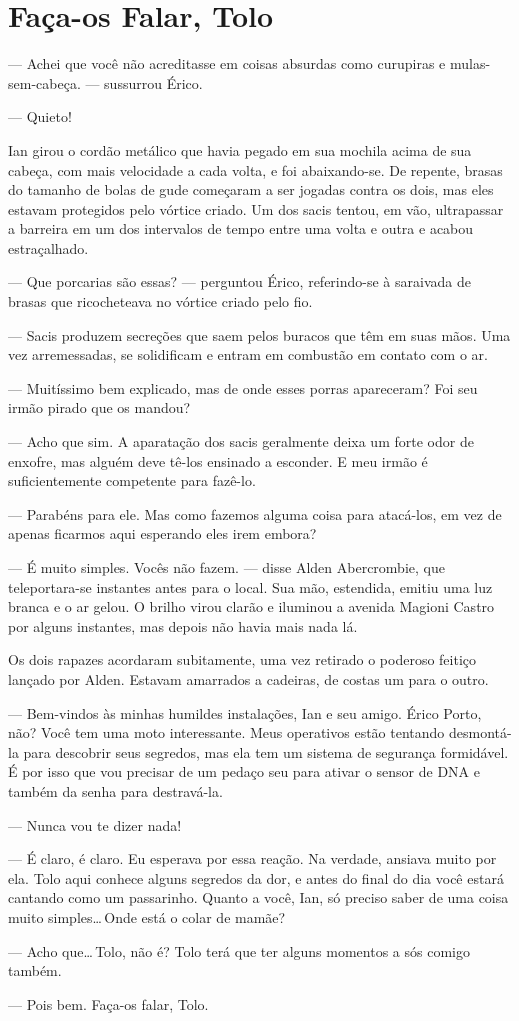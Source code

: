 \chapter{Faça-os Falar, Tolo}

--- Achei que você não acreditasse em coisas absurdas como curupiras e
mulas-sem-cabeça. --- sussurrou Érico.

--- Quieto!

Ian girou o cordão metálico que havia pegado em sua mochila acima de sua
cabeça, com mais velocidade a cada volta, e foi abaixando-se. De
repente, brasas do tamanho de bolas de gude começaram a ser jogadas
contra os dois, mas eles estavam protegidos pelo vórtice criado. Um dos
sacis tentou, em vão, ultrapassar a barreira em um dos intervalos de
tempo entre uma volta e outra e acabou estraçalhado.

--- Que porcarias são essas? --- perguntou Érico, referindo-se à
saraivada de brasas que ricocheteava no vórtice criado pelo fio.

--- Sacis produzem secreções que saem pelos buracos que têm em suas
mãos. Uma vez arremessadas, se solidificam e entram em combustão em
contato com o ar.

--- Muitíssimo bem explicado, mas de onde esses porras apareceram? Foi
seu irmão pirado que os mandou?

--- Acho que sim. A aparatação dos sacis geralmente deixa um forte odor
de enxofre, mas alguém deve tê-los ensinado a esconder. E meu irmão é
suficientemente competente para fazê-lo.

--- Parabéns para ele. Mas como fazemos alguma coisa para atacá-los, em
vez de apenas ficarmos aqui esperando eles irem embora?

--- É muito simples. Vocês não fazem. --- disse Alden Abercrombie, que
teleportara-se instantes antes para o local. Sua mão, estendida, emitiu
uma luz branca e o ar gelou. O brilho virou clarão e iluminou a avenida
Magioni Castro por alguns instantes, mas depois não havia mais nada lá.


Os dois rapazes acordaram subitamente, uma vez retirado o poderoso
feitiço lançado por Alden. Estavam amarrados a cadeiras, de costas um
para o outro.

--- Bem-vindos às minhas humildes instalações, Ian e seu amigo. Érico
Porto, não? Você tem uma moto interessante. Meus operativos estão
tentando desmontá-la para descobrir seus segredos, mas ela tem um
sistema de segurança formidável. É por isso que vou precisar de um
pedaço seu para ativar o sensor de DNA e também da senha para
destravá-la.

--- Nunca vou te dizer nada!

--- É claro, é claro. Eu esperava por essa reação. Na verdade, ansiava
muito por ela. Tolo aqui conhece alguns segredos da dor, e antes do
final do dia você estará cantando como um passarinho. Quanto a você,
Ian, só preciso saber de uma coisa muito simples\ldots\,Onde está o
colar de mamãe?

--- Acho que\ldots\,Tolo, não é? Tolo terá que ter alguns momentos a sós
comigo também.

--- Pois bem. Faça-os falar, Tolo.
